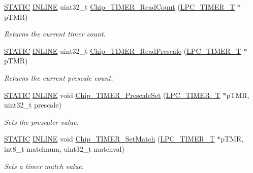 \begin{DoxyCompactItemize}
\hyperlink{group___l_p_c___types___public___macros_ga10b2d890d871e1489bb02b7e70d9bdfb}{S\+T\+A\+T\+IC} \hyperlink{spifi__18xx__43xx_8h_a2eb6f9e0395b47b8d5e3eeae4fe0c116}{I\+N\+L\+I\+NE} uint32\+\_\+t \hyperlink{group___t_i_m_e_r__18_x_x__43_x_x_ga6050d4da70d679696b3af922b8c1a6ac}{Chip\+\_\+\+T\+I\+M\+E\+R\+\_\+\+Read\+Count} (\hyperlink{struct_l_p_c___t_i_m_e_r___t}{L\+P\+C\+\_\+\+T\+I\+M\+E\+R\+\_\+T} $\ast$p\+T\+MR)
\begin{DoxyCompactList}\small\item\em Returns the current timer count. \end{DoxyCompactList}\item 
\hyperlink{group___l_p_c___types___public___macros_ga10b2d890d871e1489bb02b7e70d9bdfb}{S\+T\+A\+T\+IC} \hyperlink{spifi__18xx__43xx_8h_a2eb6f9e0395b47b8d5e3eeae4fe0c116}{I\+N\+L\+I\+NE} uint32\+\_\+t \hyperlink{group___t_i_m_e_r__18_x_x__43_x_x_ga52328278a0f1326c6ce7dc210ad010d3}{Chip\+\_\+\+T\+I\+M\+E\+R\+\_\+\+Read\+Prescale} (\hyperlink{struct_l_p_c___t_i_m_e_r___t}{L\+P\+C\+\_\+\+T\+I\+M\+E\+R\+\_\+T} $\ast$p\+T\+MR)
\begin{DoxyCompactList}\small\item\em Returns the current prescale count. \end{DoxyCompactList}\item 
\hyperlink{group___l_p_c___types___public___macros_ga10b2d890d871e1489bb02b7e70d9bdfb}{S\+T\+A\+T\+IC} \hyperlink{spifi__18xx__43xx_8h_a2eb6f9e0395b47b8d5e3eeae4fe0c116}{I\+N\+L\+I\+NE} void \hyperlink{group___t_i_m_e_r__18_x_x__43_x_x_gaa2483e6483702140e11de3183d5271f9}{Chip\+\_\+\+T\+I\+M\+E\+R\+\_\+\+Prescale\+Set} (\hyperlink{struct_l_p_c___t_i_m_e_r___t}{L\+P\+C\+\_\+\+T\+I\+M\+E\+R\+\_\+T} $\ast$p\+T\+MR, uint32\+\_\+t prescale)
\begin{DoxyCompactList}\small\item\em Sets the prescaler value. \end{DoxyCompactList}\item 
\hyperlink{group___l_p_c___types___public___macros_ga10b2d890d871e1489bb02b7e70d9bdfb}{S\+T\+A\+T\+IC} \hyperlink{spifi__18xx__43xx_8h_a2eb6f9e0395b47b8d5e3eeae4fe0c116}{I\+N\+L\+I\+NE} void \hyperlink{group___t_i_m_e_r__18_x_x__43_x_x_gaff98bdf0254cd7783c7b42655fa43cd2}{Chip\+\_\+\+T\+I\+M\+E\+R\+\_\+\+Set\+Match} (\hyperlink{struct_l_p_c___t_i_m_e_r___t}{L\+P\+C\+\_\+\+T\+I\+M\+E\+R\+\_\+T} $\ast$p\+T\+MR, int8\+\_\+t matchnum, uint32\+\_\+t matchval)
\begin{DoxyCompactList}\small\item\em Sets a timer match value. \end{DoxyCompactList}\item 

\end{DoxyCompactItemize}
